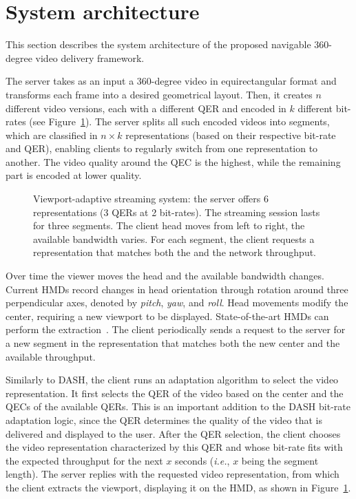 \section{System architecture}


This section describes the system architecture of the proposed
navigable $360$-degree video delivery framework.

The server takes as an input a $360$-degree video in
equirectangular format and transforms each frame into a desired
geometrical layout. Then, it creates $n$ different video
versions, each with a different \ac{QER} and encoded in $k$ different
bit-rates (see Figure~\ref{fig:newdelivery}). The server
splits all such encoded videos into segments, which are classified in
$n\!\times\!k$ representations (based on their respective bit-rate and
\ac{QER}), enabling clients to regularly switch from one
representation to another. The video quality around the
\ac{QEC} is the highest, while the remaining part is encoded at lower
quality.

\begin{figure}
   \centering
   
   \caption{Viewport-adaptive streaming system: the server offers \num{6} representations (\num{3} \acp{QER} at \num{2} bit-rates). The streaming session lasts for three segments. The client head moves from left to right, the available bandwidth varies. For each segment, the client requests a representation that matches both the \FoV{} and the network throughput.}
   \label{fig:newdelivery}
\end{figure}

Over time the viewer moves the head and the
available bandwidth changes. Current \acp{HMD} record changes
in head orientation through rotation around three perpendicular axes,
denoted by \emph{pitch}, \emph{yaw}, and \emph{roll}.
Head movements modify the \FoV{} center, requiring a new viewport
to be displayed. State-of-the-art \acp{HMD} can perform the
extraction~\cite{fovhmds}. The client periodically sends a request
to the server for a new segment in the representation that
matches both the new \FoV{} center and the available throughput.

Similarly to \ac{DASH}, the client runs
an adaptation algorithm to select the video representation. It first
selects the \ac{QER} of the video based on the \FoV{} center and
the \acp{QEC} of the available \acp{QER}. This is an important addition to
the \ac{DASH} bit-rate adaptation logic, since the \ac{QER} determines
the quality of the video that is delivered and displayed to the user.
After the \ac{QER} selection, the client chooses the video
representation characterized by this \ac{QER} and whose bit-rate fits
with the expected throughput for the next $x$ seconds (\textit{i.e.},
$x$ being the segment length). The server replies
with the requested video representation, from which the
client extracts the viewport, displaying it on the \ac{HMD}, as
shown in Figure~\ref{fig:newdelivery}.

